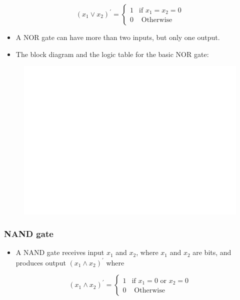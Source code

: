 \documentclass[]{book}
\providecommand{\tightlist}{%
  \setlength{\itemsep}{0pt}\setlength{\parskip}{0pt}}
\begin{document}
\begin{equation}
(x_1 \lor x_2)^\prime =
\begin{cases} 
1 & \text{if } x_1 = x_2=0\\
0 & \text{ Otherwise }
\end{cases}
\end{equation}

\begin{itemize}
\tightlist
\item
  A NOR gate can have more than two inputs, but only one output.
\item
  The block diagram and the logic table for the basic NOR gate:
\end{itemize}

\begin{figure}

{\centering \includegraphics[width=1\linewidth]{figure/boxC44-1} 

}

\end{figure}

\hypertarget{nand-gate}{%
\subsubsection{NAND gate}\label{nand-gate}}

\begin{itemize}
\tightlist
\item
  A NAND gate receives input \(x_1\) and \(x_2\), where \(x_1\) and \(x_2\) are bits, and produces output \((x_1 \land x_2)^\prime\) where
\end{itemize}

\begin{equation}
(x_1 \land x_2)^\prime =
\begin{cases} 
1 & \text{if } x_1 =0 \text{ or } x_2=0\\
0 & \text{ Otherwise }
\end{cases}
\end{equation}
\end{document}
